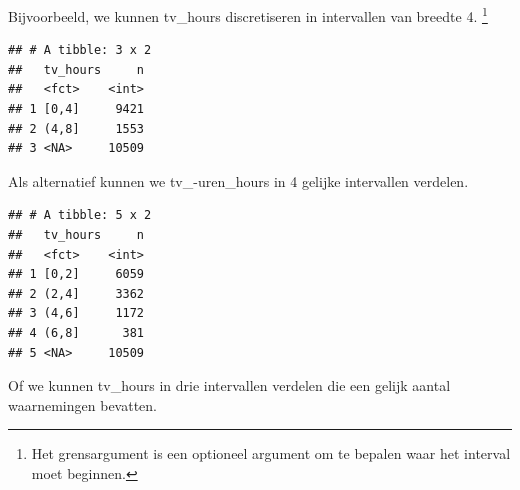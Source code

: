 \documentclass[]{tufte-book}
\newenvironment{Shaded}{}{}
\newcommand{\DataTypeTok}[1]{\textcolor[rgb]{0.56,0.13,0.00}{#1}}
\newcommand{\DecValTok}[1]{\textcolor[rgb]{0.25,0.63,0.44}{#1}}
\newcommand{\KeywordTok}[1]{\textcolor[rgb]{0.00,0.44,0.13}{\textbf{#1}}}
\newcommand{\NormalTok}[1]{#1}
\newcommand{\OperatorTok}[1]{\textcolor[rgb]{0.40,0.40,0.40}{#1}}
\newcommand{\StringTok}[1]{\textcolor[rgb]{0.25,0.44,0.63}{#1}}
\begin{document}
Bijvoorbeeld, we kunnen tv\_hours discretiseren in intervallen van breedte 4. \footnote{Het grensargument is een optioneel argument om te bepalen waar het interval moet beginnen.}

\begin{Shaded}
\end{Shaded}

\begin{verbatim}
## # A tibble: 3 x 2
##   tv_hours     n
##   <fct>    <int>
## 1 [0,4]     9421
## 2 (4,8]     1553
## 3 <NA>     10509
\end{verbatim}

Als alternatief kunnen we tv\_-uren\_hours in 4 gelijke intervallen verdelen.

\begin{Shaded}
\end{Shaded}

\begin{verbatim}
## # A tibble: 5 x 2
##   tv_hours     n
##   <fct>    <int>
## 1 [0,2]     6059
## 2 (2,4]     3362
## 3 (4,6]     1172
## 4 (6,8]      381
## 5 <NA>     10509
\end{verbatim}

Of we kunnen tv\_hours in drie intervallen verdelen die een gelijk aantal waarnemingen bevatten.

\begin{Shaded}
\end{Shaded}
\end{document}
